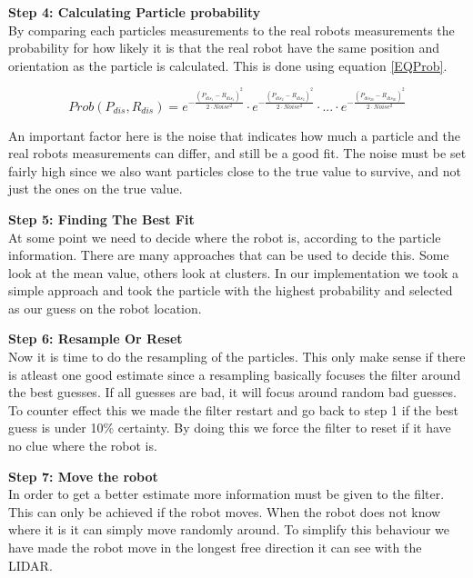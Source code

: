 \textbf{Step 4: Calculating Particle probability}\\

By comparing each particles measurements to the real robots measurements the probability for how likely it is that the real robot have the same position and orientation as the particle is calculated. This is done using equation \ref{EQProb}. 

\begin{equation}
	Prob(P_{dis},R_{dis})= e^{-{\frac{(P_{dis_1} - R_{dis_1})^2}{2 \cdot Noise^2}}} \cdot e^{-{\frac{(P_{dis_2} - R_{dis_2})^2}{2 \cdot Noise^2}}} \cdot ... \cdot e^{-{\frac{(P_{dis_{20}} - R_{dis_{20}})^2}{2 \cdot Noise^2}}}
\label{EQProb}
\end{equation}

An important factor here is the noise that indicates how much a particle and the real robots measurements can differ, and still be a good fit. The noise must be set fairly high since we also want particles close to the true value to survive, and not just the ones on the true value. 

\textbf{Step 5: Finding The Best Fit}\\
At some point we need to decide where the robot is, according to the particle information. There are many approaches that can be used to decide this. Some look at the mean value, others look at clusters. In our implementation we took a simple approach and took the particle with the highest probability and selected as our guess on the robot location. 

\textbf{Step 6: Resample Or Reset}\\
Now it is time to do the resampling of the particles. This only make sense if there is atleast one good estimate since a resampling basically focuses the filter around the best guesses. If all guesses are bad, it will focus around random bad guesses. To counter effect this we made the filter restart and go back to step 1 if the best guess is under 10\% certainty. By doing this we force the filter to reset if it have no clue where the robot is. 

\textbf{Step 7: Move the robot}\\
In order to get a better estimate more information must be given to the filter. This can only be achieved if the robot moves. When the robot does not know where it is it can simply move randomly around. To simplify this behaviour we have made the robot move in the longest free direction it can see with the LIDAR. 

